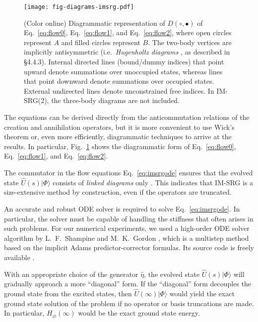 \documentclass[aip, jcp, 12pt]{revtex4-1}
\newcommand{\ket}[1]{| #1 \rangle}
\begin{document}
\begin{figure}
\texttt{[image: fig-diagrams-imsrg.pdf]}
\caption{(Color online) Diagrammatic representation of $D(\circ, \bullet)$ of Eq.\ \eqref{eq:flow0}, Eq.\ \eqref{eq:flow1}, and Eq.\ \eqref{eq:flow2}, where open circles represent $A$ and filled circles represent $B$.  The two-body vertices are implicitly antisymmetric (i.e.\ \textit{Hugenholtz diagrams} \cite{HUGENHOLTZ1957481}, as described in \cite{shavitt2009many} \S 4.4.3).  Internal directed lines (bound/dummy indices) that point upward denote summations over unoccupied states, whereas lines that point downward denote summations over occupied states.  External undirected lines denote unconstrained free indices.  In IM-SRG(2), the three-body diagrams are not included.}
\label{fig:diagrams-imsrg}
\end{figure}

The equations can be derived directly from the anticommutation relations of the creation and annihilation operators, but it is more convenient to use Wick's theorem \cite{PhysRev.80.268} or, even more efficiently, diagrammatic techniques \cite{shavitt2009many} to arrive at the results.  In particular, Fig.\ \ref{fig:diagrams-imsrg} shows the diagrammatic form of Eq.\ \eqref{eq:flow0}, Eq.\ \eqref{eq:flow1}, and Eq.\ \eqref{eq:flow2}.

The commutator in the flow equations Eq.\ \eqref{eq:imsrgode} ensures that the evolved state $\hat U(s) \ket{\Phi}$ consists of \emph{linked diagrams} only \cite{shavitt2009many}.  This indicates that IM-SRG is a size-extensive \cite{ISI:A1981MN73700014} method by construction, even if the operators are truncated.

An accurate and robust ODE solver is required to solve Eq.\ \eqref{eq:imsrgode}.  In particular, the solver must be capable of handling the stiffness that often arises in such problems.  For our numerical experiments, we used a high-order ODE solver algorithm by L.\ F.\ Shampine and M.\ K.\ Gordon \cite{shampine1975computer}, which is a multistep method based on the implicit Adams predictor-corrector formulas.  Its source code is freely available \cite{odesolver}.

With an appropriate choice of the generator $\hat{\eta}$, the evolved state $\hat U(s) \ket{\Phi}$ will gradually approach a more ``diagonal'' form.  If the ``diagonal'' form decouples the ground state from the excited states, then $\hat U(\infty) \ket{\Phi}$ would yield the exact ground state solution of the problem if no operator or basis truncations are made.  In particular, $H_\varnothing(\infty)$ would be the exact ground state energy.
\end{document}
